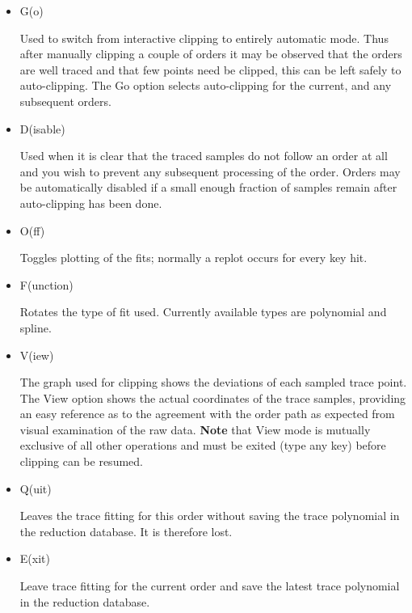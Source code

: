 \begin{itemize}
\item {\sunspec{\Large\tt}{\bf} G}(o)

     Used to switch from interactive clipping to entirely
     automatic mode. Thus after manually clipping a couple of orders
     it may be observed that the orders are well traced and that few
     points need be clipped, this can be left safely to auto-clipping.
     The Go option selects auto-clipping for the current, and any
     subsequent orders.

\item {\sunspec{\Large\tt}{\bf} D}(isable)

     Used when it is clear that the traced samples do not
     follow an order at all and you wish to prevent any subsequent
     processing of the order.  Orders may be automatically disabled
     if a small enough fraction of samples remain after auto-clipping
     has been done.

\item {\sunspec{\Large\tt}{\bf} O}(ff)

     Toggles plotting of the fits; normally a replot occurs for every
     key hit.

\item {\sunspec{\Large\tt}{\bf} F}(unction)

     Rotates the type of fit used.  Currently available types
     are polynomial and spline.

\item {\sunspec{\Large\tt}{\bf} V}(iew)

     The graph used for clipping shows the deviations of each
     sampled trace point. The View option shows the actual coordinates
     of the trace samples, providing an easy reference as to the agreement
     with the order path as expected from visual examination of the raw data.
     {\bf Note} that View mode is mutually exclusive of all other operations
     and must be exited (type any key) before clipping can be resumed.

\item {\sunspec{\Large\tt}{\bf} Q}(uit)

     Leaves the trace fitting for this order without saving
     the trace polynomial in the reduction database. It is therefore
     lost.

\item {\sunspec{\Large\tt}{\bf} E}(xit)

     Leave trace fitting for the current order and save the
     latest trace polynomial in the reduction database.


\end{itemize}
